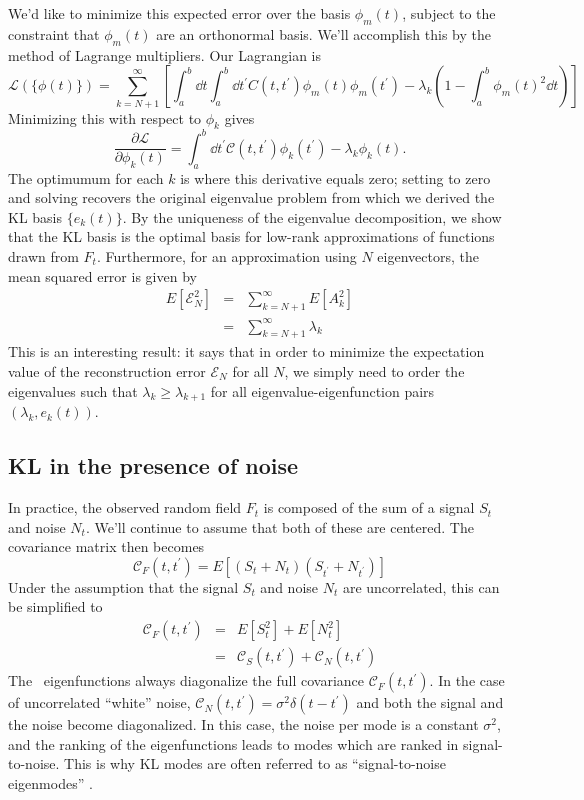 We'd like to minimize this expected error over the basis $\phi_m(t)$, subject
to the constraint that $\phi_m(t)$ are an orthonormal basis.  We'll accomplish
this by the method of Lagrange multipliers.  Our Lagrangian is
\begin{equation}
  \mathcal{L}(\{\phi(t)\}) = \sum_{k=N+1}^\infty
  \left[\int_a^b \dd t \int_a^b \dd t^\prime
  C(t, t^\prime) \phi_m(t)\phi_m(t^\prime)
  - \lambda_k(1 - \int_a^b \phi_m(t)^2 \dd t)
  \right]
\end{equation}
Minimizing this with respect to $\phi_k$ gives
\begin{equation}
  \frac{\partial\mathcal{L}}{\partial\phi_k(t)} = \int_a^b \dd t^\prime
  \mathcal{C}(t, t^\prime) \phi_k(t^\prime)
  - \lambda_k \phi_k(t).
\end{equation}
The optimumum for each $k$ is where this derivative equals zero; setting to
zero and solving recovers the original eigenvalue problem from which we
derived the KL basis $\{e_k(t)\}$.  By the uniqueness of the eigenvalue
decomposition, we show that the KL basis is the optimal basis for low-rank
approximations of functions drawn from $F_t$.  Furthermore, for an
approximation using $N$ eigenvectors, the mean squared error is given by
\begin{eqnarray}
  E[\mathcal{E}^2_N] &=& \sum_{k=N+1}^\infty E[A_k^2]\nonumber\\
  &=& \sum_{k=N+1}^\infty \lambda_k
\end{eqnarray}
This is an interesting result: it says that in order to minimize the
expectation value of the reconstruction error $\mathcal{E}_N$ for all $N$,
we simply need to order the eigenvalues such that $\lambda_k \ge \lambda_{k+1}$
for all eigenvalue-eigenfunction pairs $(\lambda_k, e_k(t))$.

\subsection{KL in the presence of noise}
In practice, the observed random field $F_t$ is composed of the sum of
a signal $S_t$ and noise $N_t$.  We'll continue to assume that both of these
are centered.  The covariance matrix then becomes
\begin{equation}
  \mathcal{C}_F(t, t^\prime) = E[(S_t + N_t)(S_{t^\prime}+N_{t^\prime})]
\end{equation}
Under the assumption that the signal $S_t$ and noise $N_t$ are uncorrelated,
this can be simplified to
\begin{eqnarray}
  \mathcal{C}_F(t, t^\prime) &=& E[S_t^2] + E[N_t^2] \nonumber\\
  &=& \mathcal{C}_S(t, t^\prime) + \mathcal{C}_N(t, t^\prime)
\end{eqnarray}
The \KL\ eigenfunctions always diagonalize the full covariance
$\mathcal{C}_F(t, t^\prime)$.
In the case of uncorrelated ``white'' noise,
$\mathcal{C}_N(t, t^\prime) = \sigma^2 \delta(t - t^\prime)$
and both the signal and the noise become diagonalized.  In this case,
the noise per mode is a constant $\sigma^2$, and the ranking of the
eigenfunctions leads to modes which are ranked in signal-to-noise.
This is why KL modes are often referred to as ``signal-to-noise
eigenmodes'' \citep{Vogeley96}.

